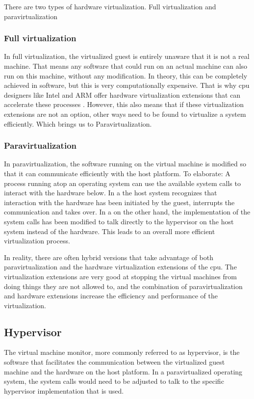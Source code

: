 There are two types of hardware virtualization. Full virtualization and paravirtualization
\subsubsection{Full virtualization}
In full virtualization, the virtualized guest is entirely unaware that it is not a real machine. That means any software that could run on an actual machine can also run on this machine, without any modification.
In theory, this can be completely achieved in software, but this is very computationally expensive. That is why \acrshort{cpu} designers like Intel and ARM offer hardware virtualization extensions that can accelerate these processes \cite{uhlig2005intel}\cite{ARM.v8.2018}. However, this also means that if these virtualization extensions are not an option, other ways need to be found to virtualize a system efficiently. Which brings us to Paravirtualization.
\subsubsection{Paravirtualization}
In paravirtualization, the software running on the virtual machine is modified so that it can communicate efficiently with the host platform. To elaborate: A process running atop an operating system can use the available system calls to interact with the hardware below. In a  the host system recognizes that interaction with the hardware has been initiated by the guest, interrupts the communication and takes over. In a  on the other hand, the implementation of the system calls has been modified to talk directly to the hypervisor on the host system instead of the hardware. This leads to an overall more efficient virtualization process.

In reality, there are often hybrid versions that take advantage of both paravirtualization and the hardware virtualization extensions of the \acrshort{cpu}. The virtualization extensions are very good at stopping the virtual machines from doing things they are not allowed to, and the combination of paravirtualization and hardware extensions increase the efficiency and performance of the virtualization.
\subsection{Hypervisor}
The virtual machine monitor, more commonly referred to as hypervisor, is the software that facilitates the communication between the virtualized guest machine and the hardware on the host platform. In a paravirtualized operating system, the system calls would need to be adjusted to talk to the specific hypervisor implementation that is used. 

